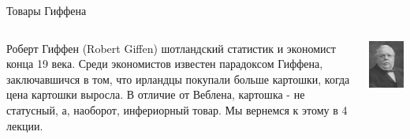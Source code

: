 \documentclass{beamer}
\begin{document}
\begin{frame}{Товары Гиффена}
\begin{columns}
\begin{column}{0.5\textwidth}
   \alert{Роберт Гиффен} (Robert Giffen) шотландский статистик и экономист конца 19 века. Среди экономистов известен \alert{парадоксом Гиффена}, заключавшичся в том, что ирландцы покупали больше картошки, когда цена картошки выросла. В отличие от Веблена, картошка - не статусный, а, наоборот, инфериорный товар. \alert{Мы вернемся к этому в 4 лекции}.

\end{column}
\begin{column}{0.5\textwidth}  %
    \begin{center}
     \includegraphics[width=1\textwidth]{giffen}
     \end{center}
\end{column}
\end{columns}
\end{frame}
\end{document}
